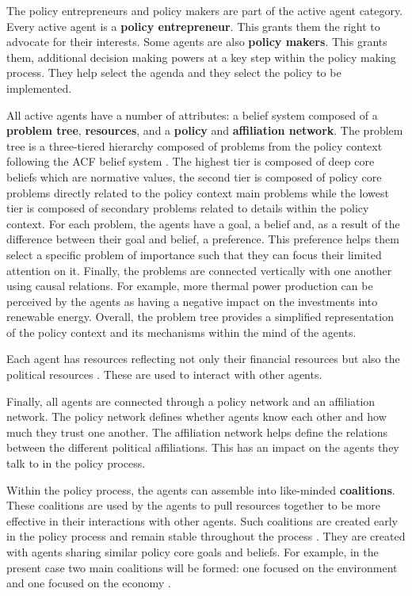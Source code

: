 The policy entrepreneurs and policy makers are part of the active agent category. Every active agent is a  {\bfseries policy entrepreneur}. This grants them the right to advocate for their interests. Some agents are also {\bfseries policy makers}. This grants them, additional decision making powers at a key step within the policy making process. They help select the agenda and they select the policy to be implemented.

All active agents have a number of attributes: a belief system composed of a {\bfseries problem tree}, {\bfseries resources}, and a {\bfseries policy} and {\bfseries affiliation network}. The problem tree is a three-tiered hierarchy composed of problems from the policy context following the ACF belief system \citep{sabatier1987knowledge}. The highest tier is composed of deep core beliefs which are normative values, the second tier is composed of policy core problems directly related to the policy context main problems while the lowest tier is composed of secondary problems related to details within the policy context. For each problem, the agents have a goal, a belief and, as a result of the difference between their goal and belief, a preference. This preference helps them select a specific problem of importance such that they can focus their limited attention on it. Finally, the problems are connected vertically with one another using causal relations. For example, more thermal power production can be perceived by the agents as having a negative impact on the investments into renewable energy. Overall, the problem tree provides a simplified representation of the policy context and its mechanisms within the mind of the agents.

Each agent has resources reflecting not only their financial resources but also the political resources \citep{nohrstedt2010logic}. These are used to interact with other agents.

Finally, all agents are connected through a policy network and an affiliation network. The policy network defines whether agents know each other and how much they trust one another. The affiliation network helps define the relations between the different political affiliations. This has an impact on the agents they talk to in the policy process.

Within the policy process, the agents can assemble into like-minded {\bfseries coalitions}. These coalitions are used by the agents to pull resources together to be more effective in their interactions with other agents. Such coalitions are created early in the policy process and remain stable throughout the process \citep{weible2018advocacy}. They are created with agents sharing similar policy core goals and beliefs. For example, in the present case two main coalitions will be formed: one focused on the environment and one focused on the economy \citep{markard2016socio}.

